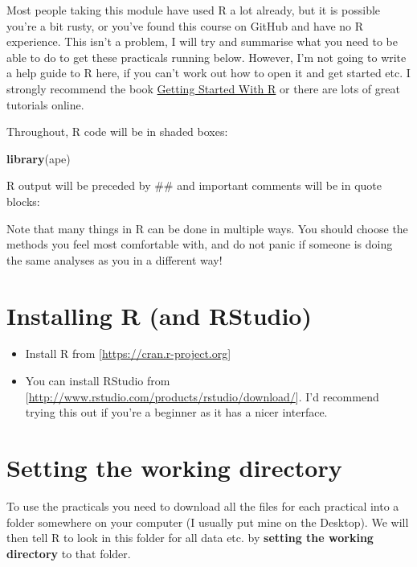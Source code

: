 \documentclass[]{book}
\newenvironment{Shaded}{\begin{snugshade}}{\end{snugshade}}
\newcommand{\KeywordTok}[1]{\textcolor[rgb]{0.13,0.29,0.53}{\textbf{{#1}}}}
\newcommand{\NormalTok}[1]{{#1}}
\providecommand{\tightlist}{%
  \setlength{\itemsep}{0pt}\setlength{\parskip}{0pt}}
\begin{document}
Most people taking this module have used R a lot already, but it is
possible you're a bit rusty, or you've found this course on GitHub and
have no R experience. This isn't a problem, I will try and summarise
what you need to be able to do to get these practicals running below.
However, I'm not going to write a help guide to R here, if you can't
work out how to open it and get started etc. I strongly recommend the
book \href{http://www.r4all.org/}{Getting Started With R} or there are
lots of great tutorials online.

Throughout, R code will be in shaded boxes:

\begin{Shaded}
\begin{Highlighting}[]
\KeywordTok{library}\NormalTok{(ape)}
\end{Highlighting}
\end{Shaded}

R output will be preceded by \#\# and important comments will be in
quote blocks:

Note that many things in R can be done in multiple ways. You should
choose the methods you feel most comfortable with, and do not panic if
someone is doing the same analyses as you in a different way!

\section{Installing R (and RStudio)}\label{installing-r-and-rstudio}

\begin{itemize}
\tightlist
\item
  Install R from {[}\url{https://cran.r-project.org}{]}
\item
  You can install RStudio from
  {[}\url{http://www.rstudio.com/products/rstudio/download/}{]}. I'd
  recommend trying this out if you're a beginner as it has a nicer
  interface.
\end{itemize}

\section{Setting the working
directory}\label{setting-the-working-directory}

To use the practicals you need to download all the files for each
practical into a folder somewhere on your computer (I usually put mine
on the Desktop). We will then tell R to look in this folder for all data
etc. by \textbf{setting the working directory} to that folder.
\end{document}
